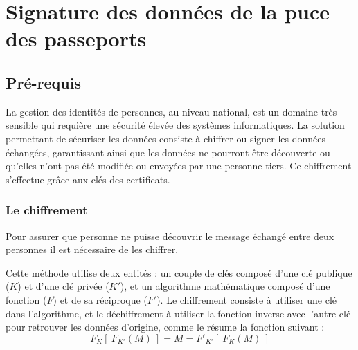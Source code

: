 \section{Signature des données de la puce des passeports}


\subsection{Pré-requis}

La gestion des identités de personnes, au niveau national, est un domaine très sensible qui requière une sécurité élevée des systèmes informatiques.
La solution permettant de sécuriser les données consiste à chiffrer ou signer les données échangées, garantissant ainsi que les données ne pourront être découverte ou qu'elles n'ont pas été modifiée ou envoyées par une personne tiers.
Ce chiffrement s'effectue grâce aux clés des certificats.


\subsubsection{Le chiffrement}

Pour assurer que personne ne puisse découvrir le message échangé entre deux personnes il est nécessaire de les chiffrer.

Cette méthode utilise deux entités : un couple de clés composé d'une clé publique ($K$) et d'une clé privée ($K'$), et un algorithme mathématique composé d'une fonction ($F$) et de sa réciproque ($F'$).
Le chiffrement consiste à utiliser une clé dans l'algorithme, et le déchiffrement à utiliser la fonction inverse avec l'autre clé pour retrouver les données d'origine, comme le résume la fonction suivant :
\[
F_K[\ F_{K'}(M)\ ] = M = F'_{K'}[\ F_K(M)\ ]
\]
\\

